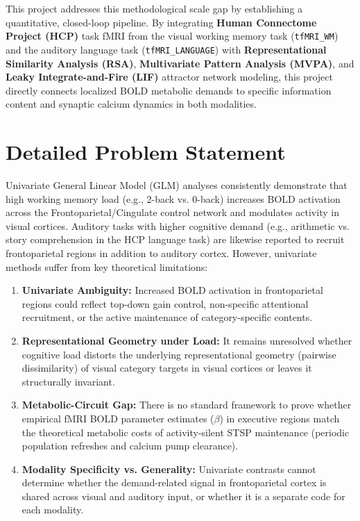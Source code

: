\documentclass[11pt,a4paper]{article}
\begin{document}
This project addresses this methodological scale gap by establishing a quantitative, closed-loop pipeline. By integrating \textbf{Human Connectome Project (HCP)} task fMRI from the visual working memory task (\texttt{tfMRI\_WM}) and the auditory language task (\texttt{tfMRI\_LANGUAGE}) with \textbf{Representational Similarity Analysis (RSA)}, \textbf{Multivariate Pattern Analysis (MVPA)}, and \textbf{Leaky Integrate-and-Fire (LIF)} attractor network modeling, this project directly connects localized BOLD metabolic demands to specific information content and synaptic calcium dynamics in both modalities.

\section{Detailed Problem Statement}

Univariate General Linear Model (GLM) analyses consistently demonstrate that high working memory load (e.g., 2-back vs. 0-back) increases BOLD activation across the Frontoparietal/Cingulate control network and modulates activity in visual cortices. Auditory tasks with higher cognitive demand (e.g., arithmetic vs. story comprehension in the HCP language task) are likewise reported to recruit frontoparietal regions in addition to auditory cortex. However, univariate methods suffer from key theoretical limitations:

\begin{enumerate}
    \item \textbf{Univariate Ambiguity:} Increased BOLD activation in frontoparietal regions could reflect top-down gain control, non-specific attentional recruitment, or the active maintenance of category-specific contents.
    \item \textbf{Representational Geometry under Load:} It remains unresolved whether cognitive load distorts the underlying representational geometry (pairwise dissimilarity) of visual category targets in visual cortices or leaves it structurally invariant.
    \item \textbf{Metabolic-Circuit Gap:} There is no standard framework to prove whether empirical fMRI BOLD parameter estimates ($\beta$) in executive regions match the theoretical metabolic costs of activity-silent STSP maintenance (periodic population refreshes and calcium pump clearance).
    \item \textbf{Modality Specificity vs. Generality:} Univariate contrasts cannot determine whether the demand-related signal in frontoparietal cortex is shared across visual and auditory input, or whether it is a separate code for each modality.
\end{enumerate}
\end{document}
